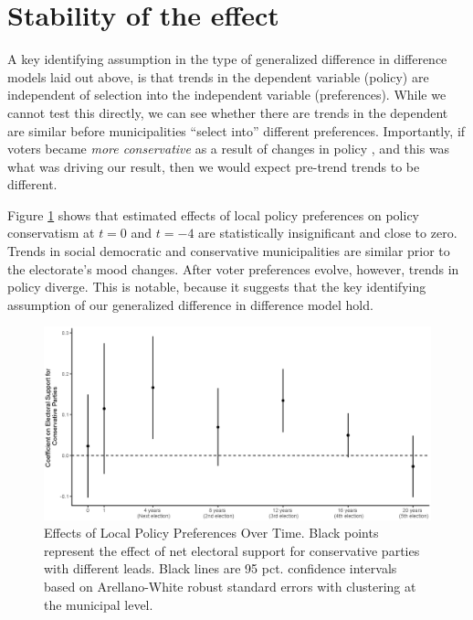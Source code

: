 \documentclass[a4paper,12pt]{article}
\begin{document}
\section{Stability of the effect}

A key identifying assumption in the type of generalized difference in difference models laid out above, is that trends in the dependent variable (policy) are independent of selection into the independent variable (preferences). While we cannot test this directly, we can see whether there are trends in the dependent are similar before municipalities ``select into'' different preferences. Importantly, if voters became \emph{more conservative} as a result of changes in policy \cite[cf.][]{lenz2013follow,slothuus2010can}, and this was what was driving our result, then we would expect pre-trend trends to be different.

Figure \ref{fig:LongRun} shows that estimated effects of local policy preferences on policy conservatism at $t=0$ and $t=-4$ are statistically insignificant and close to zero. Trends in social democratic and conservative municipalities are similar prior to the electorate's mood changes. After voter preferences evolve, however, trends in policy diverge.  This is notable, because it suggests that the key identifying assumption of our generalized difference in difference model hold.
 

\begin{figure}[h]
	\centering
	\includegraphics[scale = .6]{NoLag_varying_leads.eps}
	\caption{Effects of Local Policy Preferences Over Time. Black points represent the effect of net electoral support for conservative parties with different leads. Black lines are 95 pct. confidence intervals based on Arellano-White robust standard errors with clustering at the municipal level.}
	\label{fig:LongRun}
\end{figure}
\end{document}
